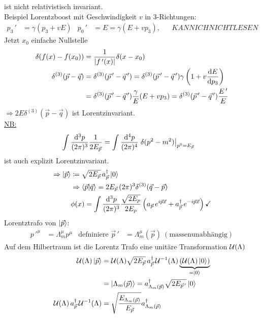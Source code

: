 ist nicht relativistisch invariant.
\\
Beispiel Lorentzboost mit Geschwindigkeit $v$ in 3-Richtungen:
	\begin{align*}
		p_3\,' &= \gamma (p_3 + v E) & p_0\,'&= E = \gamma (E+ vp_3),& &KANN ICH NICHT LESEN
	\end{align*}
Jetzt $x_0$ einfache Nullstelle
	\begin{align*}
		\delta (f(x) - f(x_0)) &= \frac{1}{|f\,'(x)|} \delta (x - x_0) \\
		\delta^{(3)} (\vec{p}- \vec{q}) &= \delta^{(3)} (\vec{p}\,'- \vec{q}\,') 
		= \delta^{(3)}(\vec{p}\,' - \vec{q}\,') \gamma 
		\left(
			1 + v \frac{\mathrm{d} E}{\mathrm{d} p_3} 
		\right) \\
		&= \delta^{(3)} (\vec{p}\,' - \vec{q}\,') \frac{\gamma}{E} (E + v p_3) 
		= \delta^{(3)} (\vec{p}\,' - \vec{q}\,') \frac{E\,'}{E}
	\end{align*}
$\Rightarrow 2E \delta^{(3)} (\vec{p} - \vec{q})$ ist Lorentzinvariant.
\\
\underline{NB:} 
	\begin{align*}
		\int \frac{\mathrm{d}^3 p}{(2\pi)^3} \frac{1}{2 E_{\vec{p}}} &=
		\int \frac{\mathrm{d}^4 p}{(2 \pi)^4} \left.\delta (p^2 - m^2)\right|_{p^0 = E_{\vec{p}}}
	\end{align*} 
ist auch explizit Lorentzinvariant.
	\begin{align*}
		\Rightarrow \ket{\vec{p}} &\coloneqq \sqrt{2 E_{\vec{p}}}\, a_{\vec{p}}^\dagger \ket{0} \\
		&\Rightarrow \braket{\vec{p} | \vec{q}} = 2 E_{\vec{p}} \,(2 \pi)^3 \delta^{(3)} (\vec{q} - \vec{p}) \\
		&\phi (x) = \int \frac{\mathrm{d}^3 p}{(2\pi)^3} \frac{\sqrt{2 E_p}}{2 E_p} 
		\left(
			a_{\vec{p}} \, e^{i\vec{p} \vec{x}} + a_{\vec{p}}^\dagger \, e^{-i\vec{p} \vec{x}}
		\right) \checkmark 
	\end{align*}
Lorentztrafo von $\ket{\vec{p}}$: 
	\begin{align*}
		p\,'^\mu &= \Lambda^\mu_m p^\mu & \text{defniniere } \vec{p}\,' &= \Lambda^\mu_m (\vec{p}) ~(\text{massenunabhängig}) 
	\end{align*}
Auf dem Hilbertraum ist die Lorentz Trafo eine unitäre Transformation $\mathcal{U} (\Lambda)$ 
	\begin{align*}
		\U(\Lambda) \ket{\vec{p}}&= \U(\Lambda) \sqrt{2 E_{\vec{p}}} \,a_{\vec{p}}^\dagger \, \U^{-1}(\Lambda) \underbrace{(\U(\Lambda) \ket{0})}_{\mathclap{= \ket{0}}} \\
		&= \ket{\Lambda_m(\vec{p})} = a_{\Lambda_m (\vec{p})}^\dagger \sqrt{2 E_{\vec{p}\,'}} \ket{0} \\
		\U(\Lambda) \, a_{\vec{p}}^\dagger \, \U^{-1} (\Lambda) &= 
		\sqrt{\frac{E_{\Lambda_m (\vec{p})}}{E_{\vec{p}}}} a^\dagger_{\Lambda_m (\vec{p})} 
	\end{align*}
